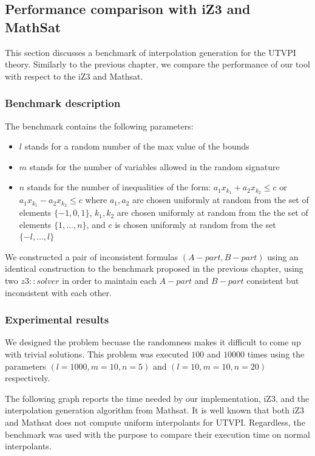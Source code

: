 \subsection{Performance comparison with iZ3 and MathSat}\label{performance_oct}

This section discusses a benchmark of interpolation 
generation for the UTVPI theory. Similarly to the previous chapter,
we compare the performance of our tool with respect to the
iZ3 and Mathsat.

\subsubsection{Benchmark description}

The benchmark contains the following parameters:

\begin{itemize}
  \item $l$ stands for a random number of the max value
    of the bounds
  \item $m$ stands for the number of variables allowed
    in the random signature
  \item $n$ stands for the number of inequalities of the
    form: $a_1 x_{k_1} + a_2 x_{k_2} \leq c$
    or $a_1 x_{k_1} - a_2 x_{k_2} \leq c$
    where $a_1, a_2$ are chosen
    uniformly at random from the set of elements
    $\{-1, 0, 1\}$, $k_1, k_2$ are chosen uniformly
    at random from the the set of elements 
    $\{1, \dots, n\}$, and $c$ is chosen uniformly
    at random from the set $\{-l, \dots, l\}$
\end{itemize}

We constructed a pair of inconsistent formulas $(A-part, B-part)$
using an identical construction to the benchmark proposed in 
the previous chapter, using two $z3: :solver$ in order to maintain
each $A-part$ and $B-part$ consistent but inconsistent with 
each other. 

\subsubsection{Experimental results}

We designed the problem becuase the randomness makes it
difficult to come up with trivial solutions. This problem 
was executed $100$ and $10000$ times using the parameters
$(l = 1000, m = 10, n = 5)$ and 
$(l = 10, m = 10, n = 20)$ respectively.

The following graph reports the time needed
by our implementation, iZ3, and the interpolation 
generation algorithm from Mathsat. 
It is well known that both iZ3 and Mathsat does not
compute uniform interpolants for UTVPI. 
Regardless, the benchmark
was used with the purpose to compare their execution time
on normal interpolants.

